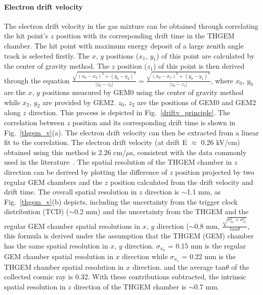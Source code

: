 \paragraph{Electron drift velocity} 
The electron drift velocity in the gas mixture can be obtained through correlating the hit point's 
 $z$ position with its corresponding drift time in the THGEM chamber. The hit point with maximum energy deposit of a large zenith angle track is selected firstly. The $x$, $y$ positions ($x_{1}$, $y_{1}$) of this point are calculated by the center of gravity method. The $z$ position ($z_{1}$) of this point is then derived through the equation  $ \frac{\sqrt{(x_{0}-x_{2})^{2}+(y_{0}-y_{2})^{2}}}{|z_{0}-z_{2}|} = \frac{\sqrt{(x_{0}-x_{1})^{2}+(y_{0}-y_{1})^{2}}}{|z_{0}-z_{1}|}$,  where $x_{0}$, $y_{0}$ are the $x$, $y$ positions measured by GEM0 using the center of gravity method while $x_{2}$, $y_{2}$ are provided by GEM2. $z_{0}$, $z_{2}$ are the positions of GEM0 and GEM2 along $z$ direction. This process is depicted in Fig.~\ref{driftv_principle}. The correlation between $z$ position and its corresponding drift time is shown in Fig.~\ref{thgem_v}(a). The electron drift velocity can then be extracted from a linear fit to the correlation. The electron drift velocity (at drift E $\approx$ 0.26 kV/cm) obtained using this method is 2.26 cm/$\mu$s, consistent with the data commonly used in the literature~\cite{driftv_data}. The spatial resolution of the THGEM chamber in $z$ direction can be derived by plotting the difference of $z$ position projected by two regular GEM chambers and the $z$ position calculated from the drift velocity and drift time. The overall spatial resolution in $z$ direction is $\sim$1.1 mm, as Fig.~\ref{thgem_v}(b) depicts, including the uncertainty from the trigger clock distribution (TCD) ($\sim$0.2 mm) and the uncertainty from the THGEM and the regular GEM chamber spatial resolutions in $x$, $y$ direction ($\sim$0.8 mm, $\frac{\sqrt{\sigma_{x_{0}}^{2}+\sigma_{x_{1}}^{2}}}{tan\theta}$, this formula is derived under the assumption that the THGEM (GEM) chamber has the same spatial resolution in $x$, $y$ direction. $\sigma_{x_{0}}$ = 0.15 mm is the regular GEM chamber spatial resolution in $x$ direction while $\sigma_{x_{1}}$ = 0.22 mm is the THGEM chamber spatial resolution in $x$ direction.  and the average tan$\theta$ of the collected cosmic ray is 0.32. With these contributions subtracted, the intrinsic spatial resolution in $z$ direction of the THGEM chamber is $\sim$0.7 mm.
 
